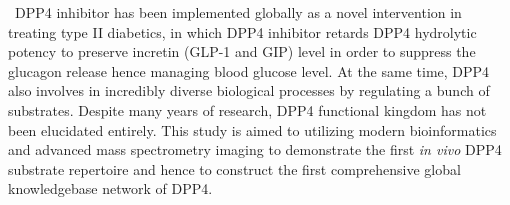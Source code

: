\ DPP4 inhibitor has been implemented globally as a novel intervention in treating type II diabetics, in which DPP4 inhibitor retards DPP4 hydrolytic potency to preserve incretin (GLP-1 and GIP) level in order to suppress the glucagon release hence managing blood glucose level. At the same time, DPP4 also involves in incredibly diverse biological processes by regulating a bunch of substrates. Despite many years of research, DPP4 functional kingdom has not been elucidated entirely. This study is aimed to utilizing modern bioinformatics and advanced mass spectrometry imaging to demonstrate the first \textit{in vivo}  DPP4 substrate repertoire and hence to construct the first comprehensive global knowledgebase network of DPP4. \\